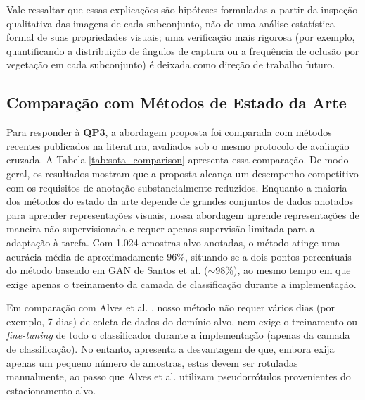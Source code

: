 \documentclass{article}
\begin{document}
Vale ressaltar que essas explicações são hipóteses formuladas a partir da inspeção qualitativa das imagens de cada subconjunto, não de uma análise estatística formal de suas propriedades visuais; uma verificação mais rigorosa (por exemplo, quantificando a distribuição de ângulos de captura ou a frequência de oclusão por vegetação em cada subconjunto) é deixada como direção de trabalho futuro.

\subsection{Comparação com Métodos de Estado da Arte}\label{subsec:res_sota}

Para responder à \textbf{QP3}, a abordagem proposta foi comparada com métodos recentes publicados na literatura, avaliados sob o mesmo protocolo de avaliação cruzada. A Tabela \ref{tab:sota_comparison} apresenta essa comparação. 
De modo geral, os resultados mostram que a proposta alcança um desempenho competitivo com os requisitos de anotação substancialmente reduzidos. Enquanto a maioria dos métodos do estado da arte depende de grandes conjuntos de dados anotados para aprender representações visuais, nossa abordagem aprende representações de maneira não supervisionada e requer apenas supervisão limitada para a adaptação à tarefa. Com 1.024 amostras-alvo anotadas, o método atinge uma acurácia média de aproximadamente 96\%, situando-se a dois pontos percentuais do método baseado em GAN de Santos et al. \cite{SantosPKLOTGAN} ($\sim$98\%), ao mesmo tempo em que exige apenas o treinamento da camada de classificação durante a implementação.

Em comparação com Alves et al. \cite{Luza2025PKLOTDISTILLING}, nosso método não requer vários dias (por exemplo, 7 dias) de coleta de dados do domínio-alvo, nem exige o treinamento ou \textit{fine-tuning} de todo o classificador durante a implementação (apenas da camada de classificação). No entanto, apresenta a desvantagem de que, embora exija apenas um pequeno número de amostras, estas devem ser rotuladas manualmente, ao passo que Alves et al. utilizam pseudorrótulos provenientes do estacionamento-alvo.
\end{document}
